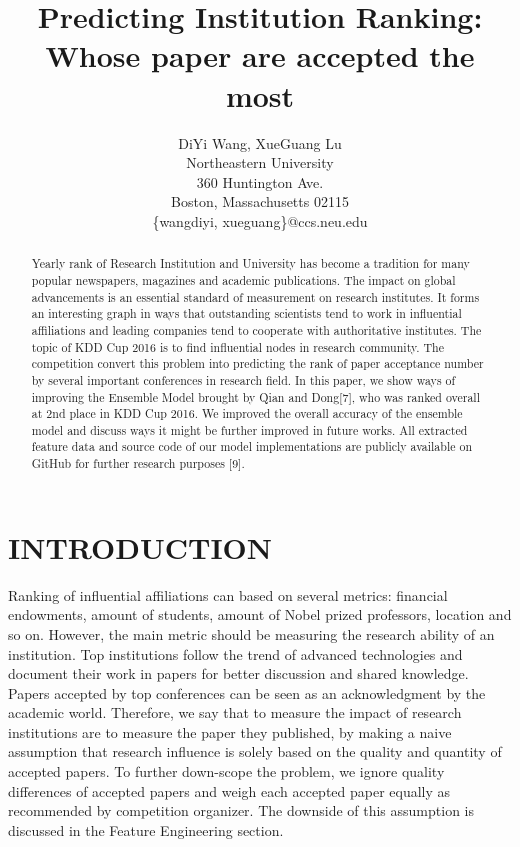 \documentclass[letterpaper]{article}
\begin{document}
%
\title{Predicting Institution Ranking: Whose paper are accepted the most}
\author{DiYi Wang, XueGuang Lu\\
Northeastern University\\
360 Huntington Ave.\\
Boston, Massachusetts 02115\\
\{wangdiyi, xueguang\}@ccs.neu.edu
}
\maketitle
\begin{abstract}
Yearly rank of Research Institution and University has become a tradition for many popular newspapers, magazines and academic publications. The impact on global advancements is an essential standard of measurement on research institutes. It forms an interesting graph in ways that outstanding scientists tend to work in influential affiliations and leading companies tend to cooperate with authoritative institutes. The topic of KDD Cup 2016 is to find influential nodes in research community. The competition convert this problem into predicting the rank of paper acceptance number by several important conferences in research field. In this paper, we show ways of improving the Ensemble Model brought by Qian and Dong[7], who was ranked overall at 2nd place in KDD Cup 2016. We improved the overall accuracy of the ensemble model and discuss ways it might be further improved in future works. All extracted feature data and source code of our model implementations are publicly available on GitHub for further research purposes [9].
\end{abstract}


\section{INTRODUCTION} 
Ranking of influential affiliations can based on several metrics: financial endowments, amount of students, amount of Nobel prized professors, location and so on. However, the main metric should be measuring the research ability of an institution. Top institutions follow the trend of advanced technologies and document their work in papers for better discussion and shared knowledge. Papers accepted by top conferences can be seen as an acknowledgment by the academic world. Therefore, we say that to measure the impact of research institutions are to measure the paper they published, by making a naive assumption that research influence is solely based on the quality and quantity of accepted papers. To further down-scope the problem, we ignore quality differences of accepted papers and weigh each accepted paper equally as recommended by competition organizer. The downside of this assumption is discussed in the Feature Engineering section.\newline
\end{document}
